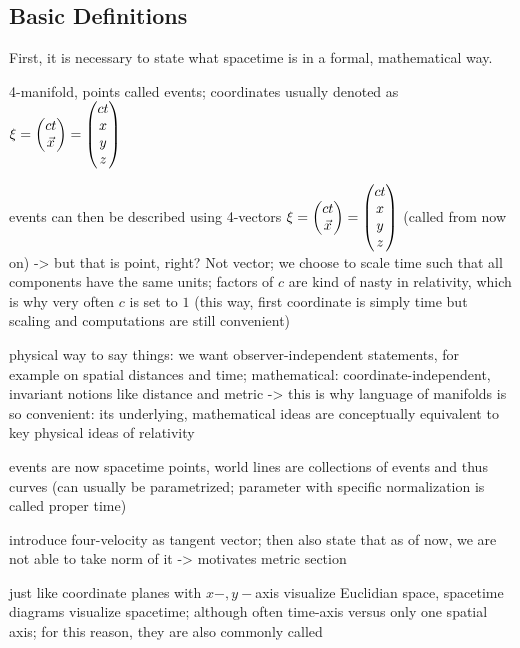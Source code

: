 		\subsection{Basic Definitions}
First, it is necessary to state what spacetime is in a formal, mathematical way.


\begin{defi}

4-manifold, points called events; coordinates usually denoted as $\mathbf{\xi} = \mqty(c t \\ \vec{x}) = \mqty(c t \\ x \\ y \\ z)$

events can then be described using 4-vectors $\mathbf{\xi} = \mqty(c t \\ \vec{x}) = \mqty(c t \\ x \\ y \\ z)$ (called  from now on) -> but that is point, right? Not vector; we choose to scale time such that all components have the same units; factors of $c$ are kind of nasty in relativity, which is why very often $c$ is set to $1$ (this way, first coordinate is simply time but scaling and computations are still convenient)
\end{defi}



physical way to say things: we want observer-independent statements, for example on spatial distances and time; mathematical: coordinate-independent, invariant notions like distance and metric -> this is why language of manifolds is so convenient: its underlying, mathematical ideas are conceptually equivalent to key physical ideas of relativity



events are now spacetime points, world lines are collections of events and thus curves (can usually be parametrized; parameter with specific normalization is called proper time)


introduce four-velocity as tangent vector; then also state that as of now, we are not able to take norm of it -> motivates metric section



just like coordinate planes with $x-, y-$axis visualize Euclidian space, spacetime diagrams visualize spacetime; although often time-axis versus only one spatial axis; for this reason, they are also commonly called 



